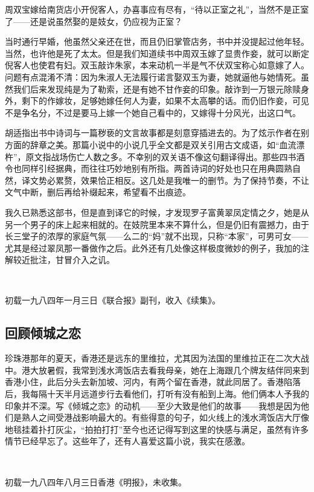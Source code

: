\par 周双宝嫁给南货店小开倪客人，办喜事应有尽有，“待以正室之礼”，当然不是正室了——还是说虽然娶的是妓女，仍应视为正室？
\par 当时通行早婚，他虽然父亲还在世，而且仍旧掌管店务，书中并没提起过他年轻。当然，也许他是死了太太。但是我们知道续书中周双玉嫁了显贵作妾，就可以断定倪客人也使君有妇。双玉敲诈朱家，本来动机一半是气不伏双宝称心如意嫁了人。问题有点混淆不清：因为朱淑人无法履行诺言娶双玉为妻，她就逼他与她情死。虽然我们后来发现纯是为了勒索，还是有她不甘作妾的印象。敲诈到一万银元除赎身外，剩下的作嫁妆，足够她嫁任何人为妻，如果不太高攀的话。而仍旧作妾，可见不是争名分，不过是要马上嫁一个她自己看中的，又嫁得十分风光，出这口气。
\par 胡适指出书中诗词与一篇秽亵的文言故事都是刻意穿插进去的。为了炫示作者在别方面的辞章之美。那篇小说中的小说几乎全文都是双关引用古文成语，如“血流漂杵”，原文指战场伤亡人数之多。不幸别的双关语不像这句翻译得出。那些四书酒令也同样引经据典，而往往巧妙地别有所指。两首诗词的好处也只在用典圆熟自然，译文势必累赘，效果恰正相反。这几处是我唯一的删节。为了保持节奏，不让文气中断，删后再给补缀起来，希望看不出痕迹。
\par 我久已熟悉这部书，但是直到译它的时候，才发现罗子富黄翠凤定情之夕，她是从另一个男子的床上起来相就的。在妓院里本来不算什么，但是仍旧有震撼力，由于长三堂子的浓厚的家庭气氛——么二的“妈”就不出现，只称“本家”，可男可女——尤其是经过翠凤那一番做作之后。此外还有几处像这样极度微妙的例子，我加的注解较近批注，甘冒介入之讥。
\par  
\par *初载一九八四年一月三日《联合报》副刊，收入《续集》。



\subsection{回顾倾城之恋}

\par 珍珠港那年的夏天，香港还是远东的里维拉，尤其因为法国的里维拉正在二次大战中。港大放暑假，我常到浅水湾饭店去看我母亲，她在上海跟几个牌友结伴同来到香港小住，此后分头去新加坡、河内，有两个留在香港，就此同居了。香港陷落后，我每隔十天半月远道步行去看他们，打听有没有船到上海。他们俩本人予我的印象并不深。写《倾城之恋》的动机——至少大致是他们的故事——我想是因为他们是熟人之间受港战影响最大的。有些得意的句子，如火线上的浅水湾饭店大厅像地毯挂着扑打灰尘，“拍拍打打”至今也还记得写到这里的快感与满足，虽然有许多情节已经早忘了。这些年了，还有人喜爱这篇小说，我实在感激。
\par  
\par *初载一九八四年八月三日香港《明报》，未收集。




